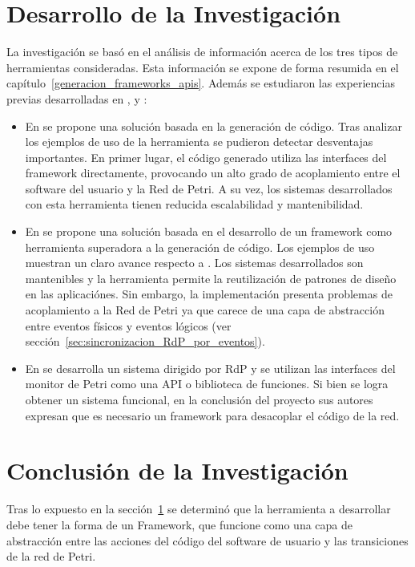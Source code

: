 \section{Desarrollo de la Investigación}
\label{sec:investigacion_desarrollo}
La investigación se basó en el análisis de información acerca de los tres tipos
de herramientas consideradas. Esta información se expone de forma resumida en
el capítulo~\ref{generacion_frameworks_apis}. Además se estudiaron las
experiencias previas desarrolladas en \cite{codegen}, \cite{chimp} y
\cite{Bentivegna-Ludemann}:
\begin{itemize}
  \item En \cite{codegen} se propone una solución basada en la generación de
  código. Tras analizar los ejemplos de uso de la herramienta se pudieron
  detectar desventajas importantes. En primer lugar, el código generado 
  utiliza las interfaces del framework directamente, provocando un alto grado de
  acoplamiento entre el software del usuario y la Red de Petri. A su vez, los
  sistemas desarrollados con esta herramienta tienen reducida escalabilidad y
  mantenibilidad.
  \item En \cite{chimp} se propone una solución basada en el desarrollo de un
  framework como herramienta superadora a la generación de código. Los ejemplos
  de uso muestran un claro avance respecto a \cite{codegen}. Los
  sistemas desarrollados son mantenibles y la herramienta permite la
  reutilización de patrones de diseño en las aplicaciónes.
  Sin embargo, la implementación presenta problemas de acoplamiento a la Red de
  Petri ya que carece de una capa de abstracción entre eventos físicos y eventos
  lógicos (ver sección~\ref{sec:sincronizacion_RdP_por_eventos}).
  \item En \cite{Bentivegna-Ludemann} se desarrolla un sistema dirigido por RdP
  y se utilizan las interfaces del monitor de Petri como una API o
  biblioteca de funciones. Si bien se logra obtener un sistema funcional, en la
  conclusión del proyecto sus autores expresan que es necesario un framework
  para desacoplar el código de la red.
\end{itemize}

\section{Conclusión de la Investigación}
Tras lo expuesto en la sección~\ref{sec:investigacion_desarrollo} se determinó
que la herramienta a desarrollar debe tener la forma de un Framework, que
funcione como una capa de abstracción entre las acciones del código del software
de usuario y las transiciones de la red de Petri.